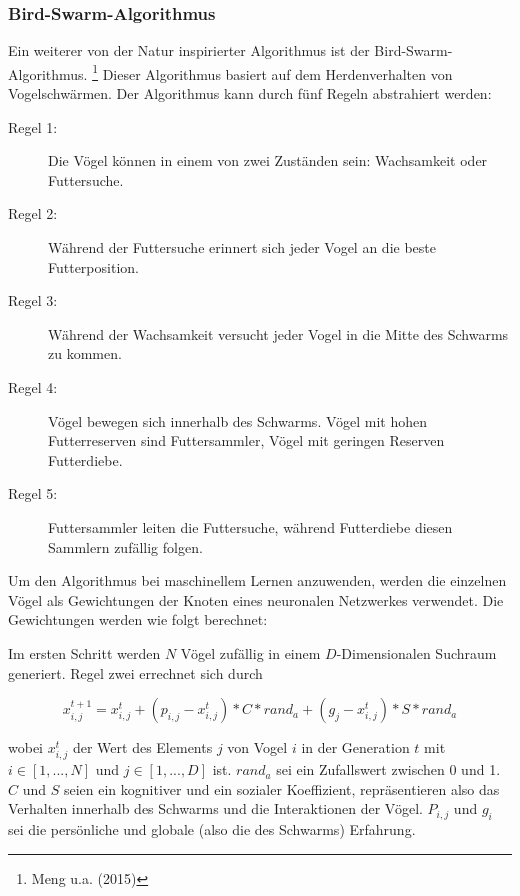 \documentclass[a4paper,12pt]{article}
\begin{document}
\subsubsection{Bird-Swarm-Algorithmus}

Ein weiterer von der Natur inspirierter Algorithmus ist der Bird-Swarm-Algorithmus. \footnote{Meng u.a. (2015)} Dieser Algorithmus basiert auf dem Herdenverhalten von Vogelschwärmen. Der Algorithmus kann durch fünf Regeln abstrahiert werden:

\begin{description}

\item[Regel 1:] Die Vögel können in einem von zwei Zuständen sein: Wachsamkeit oder Futtersuche.

\item[Regel 2:] Während der Futtersuche erinnert sich jeder Vogel an die beste Futterposition.

\item[Regel 3:] Während der Wachsamkeit versucht jeder Vogel in die Mitte des Schwarms zu kommen. 

\item[Regel 4:] Vögel bewegen sich innerhalb des Schwarms. Vögel mit hohen Futterreserven sind Futtersammler, Vögel mit geringen Reserven Futterdiebe.

\item[Regel 5:] Futtersammler leiten die Futtersuche, während Futterdiebe diesen Sammlern zufällig folgen. 

\end{description}

Um den Algorithmus bei maschinellem Lernen anzuwenden, werden die einzelnen Vögel als Gewichtungen der Knoten eines neuronalen Netzwerkes verwendet. Die Gewichtungen werden wie folgt berechnet:

Im ersten Schritt werden $N$ Vögel zufällig in einem $D$-Dimensionalen Suchraum generiert. Regel zwei errechnet sich durch 

\begin{equation}
x_{i,j}^{t+1}=x_{i,j}^t+(p_{i,j}-x_{i,j}^t)*C *rand_a+(g_j-x_{i,j}^t)*S*rand_a
\end{equation}

wobei $x_{i,j}^t$ der Wert des Elements $j$ von Vogel $i$ in der Generation $t$ mit $i \in [1,...,N]$ und $j \in [1,...,D]$ ist. $rand_a$ sei ein Zufallswert zwischen 0 und 1. $C$ und $S$ seien ein kognitiver und ein sozialer Koeffizient, repräsentieren also das Verhalten innerhalb des Schwarms und die Interaktionen der Vögel. $P_{i,j}$ und $g_i$ sei die persönliche und globale (also die des Schwarms) Erfahrung. 
\end{document}
